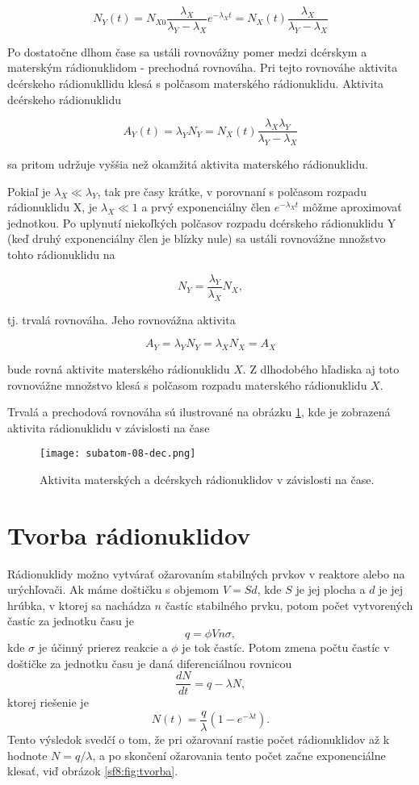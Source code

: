 \documentclass[../../main.tex]{subfiles}
\begin{document}
\begin{itemize}
$$ N_Y(t) = N_{X0}\frac{\lambda_X}{\lambda_Y - \lambda_X}e^{-\lambda_Xt} = N_X(t)\frac{\lambda_X}{\lambda_Y - \lambda_X} $$

Po dostatočne dlhom čase sa ustáli rovnovážny pomer medzi dcérskym a materským rádionuklidom - prechodná rovnováha. Pri tejto rovnováhe aktivita dcérskeho rádionukllidu klesá s polčasom materského rádionuklidu. Aktivita dcérskeho rádionuklidu 

$$ A_Y(t) = \lambda_YN_Y = N_X(t)\frac{\lambda_X\lambda_Y}{\lambda_Y-\lambda_X} $$

sa pritom udržuje vyššia než okamžitá aktivita materského rádionuklidu.

Pokiaľ je $\lambda_X\ll\lambda_Y$, tak pre časy krátke, v porovnaní s polčasom rozpadu rádionuklidu X, je $\lambda_X \ll 1$ a prvý exponenciálny člen $e^{-\lambda_Xt}$ môžme aproximovať jednotkou. Po uplynutí niekoľkých polčasov rozpadu dcérskeho rádionuklidu Y (keď druhý exponenciálny člen je blízky nule) sa ustáli rovnovážne množstvo tohto rádionuklidu na 

$$ N_Y = \frac{\lambda_Y}{\lambda_X}N_X, $$ 

tj. trvalá rovnováha. Jeho rovnovážna aktivita 

$$ A_Y = \lambda_YN_Y = \lambda_XN_X = A_X $$

bude rovná aktivite materského rádionuklidu $X$. Z dlhodobého hľadiska aj toto rovnovážne množstvo klesá s polčasom rozpadu materského rádionuklidu $X$.
\end{itemize}

Trvalá a prechodová rovnováha sú ilustrované na obrázku \ref{sf8:fig:dec}, kde je zobrazená aktivita rádionuklidu v závislosti na čase 
\begin{figure}[!h]
\texttt{[image: subatom-08-dec.png]}
\centering
\caption{Aktivita materských a dcérskych rádionuklidov v závislosti na čase.}
\label{sf8:fig:dec}
\end{figure}

\section{Tvorba rádionuklidov}
Rádionuklidy možno vytvárať ožarovaním stabilných prvkov v reaktore alebo na urýchľovači. Ak máme doštičku s objemom $V=Sd$, kde $S$ je jej plocha a $d$ je jej hrúbka, v ktorej sa nachádza $n$ častíc stabilného prvku, potom počet vytvorených častíc za jednotku času je 
$$ q = \phi Vn \sigma,$$
kde $\sigma$ je účinný prierez reakcie a $\phi$ je tok častíc. Potom zmena počtu častíc v doštičke za jednotku času je daná diferenciálnou rovnicou
$$ \frac{dN}{dt} = q - \lambda N, $$
ktorej riešenie je 
$$ N(t) = \frac{q}{\lambda} (1-e^{-\lambda t}).$$
Tento výsledok svedčí o tom, že pri ožarovaní rastie počet rádionuklidov až k hodnote $N=q / \lambda$, a po skončení ožarovania tento počet začne exponenciálne klesať, viď obrázok \ref{sf8:fig:tvorba}.
\end{document}
